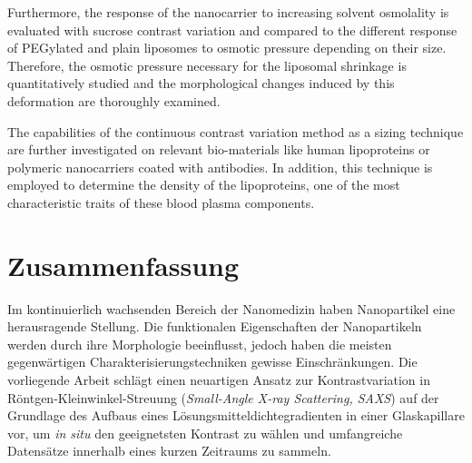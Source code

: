 Furthermore, the response of the nanocarrier to increasing solvent osmolality is evaluated with sucrose contrast variation and compared to the different response of PEGylated and plain liposomes to osmotic pressure depending on their size. Therefore, the osmotic pressure necessary for the liposomal shrinkage is quantitatively studied and the morphological changes induced by this deformation are thoroughly examined.


The capabilities of the continuous contrast variation method as a sizing technique  are further investigated on relevant bio-materials like human lipoproteins or polymeric nanocarriers coated with antibodies. In addition, this technique is employed to determine the density of the lipoproteins, one of the most characteristic traits of these blood plasma components.





\normalsize

\cleardoublepage

\thispagestyle{empty}

\chapter*{Zusammenfassung}


Im kontinuierlich wachsenden Bereich der Nanomedizin haben Nanopartikel eine herausragende Stellung. Die funktionalen Eigenschaften der Nanopartikeln werden durch ihre Morphologie beeinflusst, jedoch haben die meisten gegenwärtigen Charakterisierungstechniken gewisse Einschränkungen. Die vorliegende Arbeit schlägt einen neuartigen Ansatz zur Kontrastvariation in Röntgen-Kleinwinkel-Streuung (\emph{Small-Angle X-ray Scattering, SAXS}) auf der Grundlage des Aufbaus eines Lösungsmitteldichtegradienten in einer Glaskapillare vor, um \emph{in situ} den geeignetsten Kontrast zu wählen und umfangreiche Datensätze innerhalb eines kurzen Zeitraums zu sammeln.

